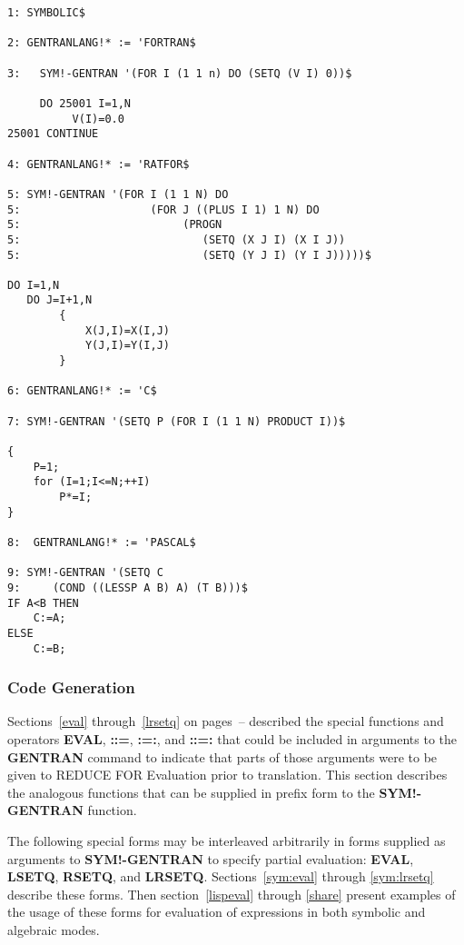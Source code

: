 \begin{describe}{\example}
\begin{verbatim}
1: SYMBOLIC$

2: GENTRANLANG!* := 'FORTRAN$

3:   SYM!-GENTRAN '(FOR I (1 1 n) DO (SETQ (V I) 0))$

     DO 25001 I=1,N
          V(I)=0.0
25001 CONTINUE

4: GENTRANLANG!* := 'RATFOR$

5: SYM!-GENTRAN '(FOR I (1 1 N) DO
5:                    (FOR J ((PLUS I 1) 1 N) DO
5:                         (PROGN
5:                            (SETQ (X J I) (X I J))
5:                            (SETQ (Y J I) (Y I J)))))$

DO I=1,N
   DO J=I+1,N
        {
            X(J,I)=X(I,J)
            Y(J,I)=Y(I,J)
        }

6: GENTRANLANG!* := 'C$

7: SYM!-GENTRAN '(SETQ P (FOR I (1 1 N) PRODUCT I))$

{
    P=1;
    for (I=1;I<=N;++I)
        P*=I;
}

8:  GENTRANLANG!* := 'PASCAL$

9: SYM!-GENTRAN '(SETQ C
9:     (COND ((LESSP A B) A) (T B)))$
IF A<B THEN
    C:=A;
ELSE
    C:=B;

\end{verbatim}
\end{describe}


\subsubsection{Code Generation} 
\label{sym:cg}
Sections~\ref{eval} through~\ref{lrsetq} on
pages~\pageref{eval}--\pageref{lrsetq} described the special functions
and operators {\bf EVAL}, {\bf ::=}, {\bf :=:}, and {\bf ::=:} that
could be included in arguments to the {\bf GENTRAN} command to
indicate that parts of those arguments were to be given to REDUCE FOR
Evaluation prior to translation.  This section describes the analogous
functions that can be supplied in prefix form to the {\bf SYM!-GENTRAN}
function.

The following special forms may be interleaved arbitrarily in forms
supplied as arguments to {\bf SYM!-GENTRAN} to specify partial
   
evaluation:  {\bf EVAL}, {\bf LSETQ}, {\bf RSETQ}, and {\bf LRSETQ}.
Sections~\ref{sym:eval} through \ref{sym:lrsetq} describe these forms. Then
section~\ref{lispeval} through \ref{share}
present examples of the usage of these
forms for evaluation of expressions in both symbolic and algebraic modes.

